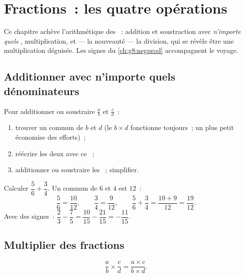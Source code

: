 \chapter{Fractions~: les quatre opérations}\label{ch:g8:fractions}

Ce chapitre achève l'arithmétique des ~: addition et
soustraction avec \emph{n'importe quels} , multiplication,
et --- la nouveauté --- la division, qui se révèle être une
multiplication déguisée. Les signes du \cref{ch:g8:negprod}
accompagnent le voyage.

\section{Additionner avec n'importe quels dénominateurs}

\begin{method}\label{met:g8:fractions:add}
Pour additionner ou soustraire $\frac ab$ et $\frac cd$~:
\begin{enumerate}
  \item trouver un  commun de $b$ et $d$ (le 
        $b \times d$ fonctionne toujours~; un plus petit économise
        des efforts)~;
  \item réécrire les deux  avec ce ~;
  \item additionner ou soustraire les ~; simplifier.
\end{enumerate}
\end{method}

\begin{example}\label{ex:g8:fractions:add}
Calculer $\dfrac{5}{6} + \dfrac{3}{4}$. Un  commun de $6$ et
$4$ est $12$~:
\[
\frac{5}{6} = \frac{10}{12},
\qquad
\frac{3}{4} = \frac{9}{12},
\qquad
\frac{5}{6} + \frac{3}{4} = \frac{10 + 9}{12} = \frac{19}{12}.
\]
Avec des signes~: $\dfrac{2}{3} - \dfrac{7}{5} = \dfrac{10}{15} -
\dfrac{21}{15} = -\dfrac{11}{15}$.
\end{example}

\section{Multiplier des fractions}

\begin{theorem}\label{thm:g8:fractions:mult}
\[
\frac{a}{b} \times \frac{c}{d} = \frac{a \times c}{b \times d} .
\]
\end{theorem}

